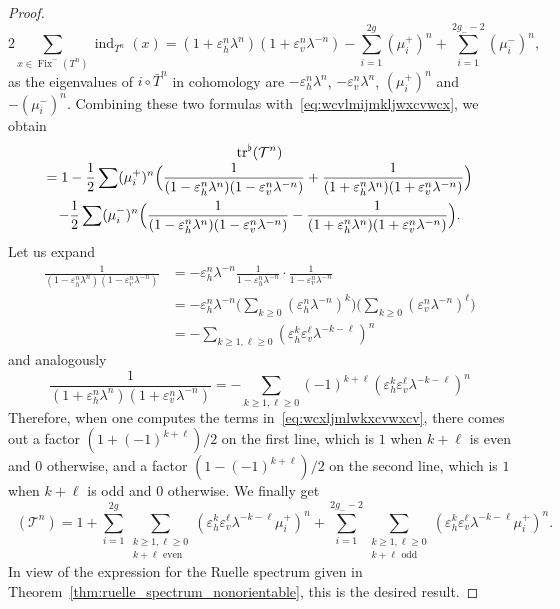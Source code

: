 \documentclass[10pt]{amsart}
\newcommand{\boT}{\mathcal{T}}
\newcommand{\pareB}[1]{\Bigl(#1\Bigr)}
\newcommand{\paregg}[1]{\biggl(#1\biggr)}
\DeclareMathOperator{\ind}{ind}
\DeclareMathOperator{\Fix}{Fix}
\DeclareMathOperator{\flattr}{\mathrm{tr}^{\flat}}
\let\epsilon\varepsilon
\theoremstyle{definition}
\numberwithin{equation}{section}
\begin{document}
\begin{proof}
\begin{equation*}
2\sum_{x \in \Fix^-(T^n)} \ind_{T^n}(x) = (1+\epsilon_h^n \lambda^n) (1+\epsilon_v^n \lambda^{-n}) - \sum_{i=1}^{2g} (\mu_i^+)^n + \sum_{i=1}^{2g_--2} (\mu_i^-)^n,
\end{equation*}
as the eigenvalues of $i\circ \bar T^n$ in cohomology are $-\epsilon_h^n
\lambda^n$, $-\epsilon_v^n \lambda^n$, $(\mu_i^+)^n$ and $-(\mu_i^-)^n$.
Combining these two formulas with~\eqref{eq:wcvlmijmkljwxcvwcx}, we obtain\vspace*{-3pt}
\begin{multline}
\label{eq:wcxljmlwkxcvwxcv}
\flattr(\boT^n) \\[-3pt]
= 1  -\frac{1}{2} \sum (\mu_i^+)^n
\pareB{\frac{1}{(1-\epsilon_h^n \lambda^n) (1-\epsilon_v^n \lambda^{-n})} + \frac{1}{(1+\epsilon_h^n \lambda^n) (1+\epsilon_v^n \lambda^{-n})}}
\\ 
- \frac{1}{2} \sum (\mu_i^-)^n
\pareB{\frac{1}{(1-\epsilon_h^n \lambda^n) (1-\epsilon_v^n \lambda^{-n})} - \frac{1}{(1+\epsilon_h^n \lambda^n) (1+\epsilon_v^n \lambda^{-n})}}.
\end{multline}
Let us expand\vspace*{-3pt}
\begin{align*}
\frac{1}{(1-\epsilon_h^n \lambda^n) (1-\epsilon_v^n \lambda^{-n})}
& = -\epsilon_h^n \lambda^{-n} \frac{1}{1-\epsilon_h^n \lambda^{-n}}\cdot \frac{1}{1-\epsilon_v^n \lambda^{-n}}
\\& = -\epsilon_h^n \lambda^{-n} \paregg{\sum_{k\geq 0} (\epsilon_h^n \lambda^{-n})^k} \paregg{\sum_{k\geq 0} (\epsilon_v^n \lambda^{-n})^\ell}
\\& = - \sum_{k\geq 1, \ell \geq 0} (\epsilon_h^k \epsilon_v^\ell \lambda^{-k-\ell})^n
\end{align*}
and analogously\vspace*{-3pt}
\begin{equation*}
\frac{1}{(1+\epsilon_h^n \lambda^n) (1+\epsilon_v^n \lambda^{-n})}
= - \sum_{k\geq 1, \ell \geq 0} (-1)^{k+\ell} (\epsilon_h^k \epsilon_v^\ell \lambda^{-k-\ell})^n
\end{equation*}
Therefore, when one computes the terms in~\eqref{eq:wcxljmlwkxcvwxcv}, there
comes out a factor \hbox{$(1+(-1)^{k+\ell})/2$} on the first line, which is $1$ when
$k+\ell$ is even and $0$ otherwise, and a factor $(1-(-1)^{k+\ell})/2$ on the
second line, which is $1$ when $k+\ell$ is odd and $0$ otherwise. We finally
get\vspace*{-3pt}
\begin{equation*}
\flattr(\boT^n) = 1 + \sum_{i=1}^{2g} \sum_{\substack{k \geq 1, \ell \geq 0\\k + \ell \text{ even}}} (\epsilon_h^k \epsilon_v^\ell \lambda^{-k-\ell}\mu_i^+)^n
+ \sum_{i=1}^{2g_--2} \sum_{\substack{k \geq 1, \ell \geq 0\\k + \ell \text{ odd}}} (\epsilon_h^k \epsilon_v^\ell \lambda^{-k-\ell}\mu_i^+)^n.
\end{equation*}
In view of the expression for the Ruelle spectrum given in
Theorem~\ref{thm:ruelle_spectrum_nonorientable}, this is the desired result.
\end{proof}
\end{document}
